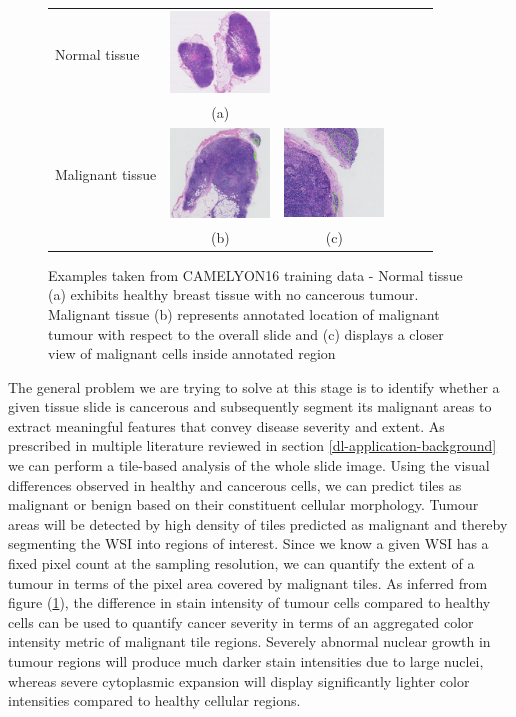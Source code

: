 \documentclass{l4proj}
\begin{document}
\begin{figure}[H]
\centering
\begin{tabular}{lccccc}
Normal tissue&
\includegraphics[width=100px]{images/camelyon16-normal-example.png}&
\\&
(a)\\
Malignant tissue&
 \includegraphics[width=100px]{images/Camelyon16-cancer-example1.png}&
 \includegraphics[width=100px]{images/Camelyon16-cancer-example2.png}&
 \\&
 (b)&(c)\\
\end{tabular}
\caption{Examples taken from CAMELYON16 training data - Normal tissue (a) exhibits healthy breast tissue with no cancerous tumour. Malignant tissue (b) represents annotated location of malignant tumour with respect to the overall slide and (c) displays a closer view of malignant cells inside annotated region}
\label{fig:camelyon16-example}
\end{figure}

The general problem we are trying to solve at this stage is to identify whether a given tissue slide is cancerous and subsequently segment its malignant areas to extract meaningful features that convey disease severity and extent. As prescribed in multiple literature reviewed in section \ref{dl-application-background} we can perform a tile-based analysis of the whole slide image. Using the visual differences observed in healthy and cancerous cells, we can predict tiles as malignant or benign based on their constituent cellular morphology. Tumour areas will be detected by high density of tiles predicted as malignant and thereby segmenting the WSI into regions of interest. Since we know a given WSI has a fixed pixel count at the sampling resolution, we can quantify the extent of a tumour in terms of the pixel area covered by malignant tiles. As inferred from figure (\ref{fig:camelyon16-example}), the difference in stain intensity of tumour cells compared to healthy cells can be used to quantify cancer severity in terms of an aggregated color intensity metric of malignant tile regions. Severely abnormal nuclear growth in tumour regions will produce much darker stain intensities due to large nuclei, whereas severe cytoplasmic expansion will display significantly lighter color intensities compared to healthy cellular regions.
\end{document}
